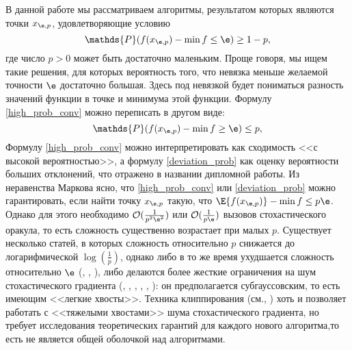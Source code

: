 В данной работе мы рассматриваем алгоритмы, результатом которых являются точки $x_{\e, p}$, удовлетворяющие условию
\begin{equation} \label{high_prob_conv}
   \mathds{P} (f(x_{\e, p})-\min f \le \e) \ge 1 - p,  
\end{equation}
где число $p > 0$ может быть достаточно маленьким. Проще говоря, мы ищем такие решения, для которых вероятность того, что невязка меньше желаемой точности $\e$ достаточно большая. Здесь под невязкой будет пониматься разность значений функции в точке и минимума этой функции. Формулу \eqref{high_prob_conv} можно переписать в другом виде:
\begin{equation} \label{deviation_prob}
   \mathds{P} (f(x_{\e, p})-\min f \ge \e) \le p,  
\end{equation}
Формулу \eqref{high_prob_conv} можно интерпретировать как сходимость <<с высокой вероятностью>>, а формулу \eqref{deviation_prob} как оценку вероятности больших отклонений, что отражено в названии дипломной работы.
Из неравенства Маркова ясно, что \eqref{high_prob_conv} или \eqref{deviation_prob} можно гарантировать, если найти точку $x_{\e, p}$ такую, что $\E{f(x_{\e, p})} - \min f \le p\e$. Однако для этого необходимо $\mathcal{O} (\frac{1}{p^2\e^2})$ или $\mathcal{O} (\frac{1}{p\e})$ вызовов стохастического оракула, то есть сложность существенно возрастает при малых $p$. Существует несколько статей, в которых сложность относительно $p$ снижается до логарифмической $\log(\frac{1}{p})$, однако либо в то же время ухудшается сложность относительно $\e$ (\cite{bousquet2002stability}, \cite{nesterov2008confidence}, \cite{shalev2009stochastic}), либо делаются более жесткие ограничения на шум стохастического градиента (\cite{nemirovski2009robust}, \cite{juditsky2014deterministic}, \cite{ghadimi2012optimal}, \cite{ghadimi2013optimal}, \cite{harvey2019simple}, \cite{harvey2019tight}): он предполагается субгауссовским, то есть имеющим <<легкие хвосты>>. Техника клиппирования (см.\cite{gorbunov2020stochastic}, \cite{gorbunov2024high}) хоть и позволяет работать с <<тяжелыми хвостами>> шума стохастического градиента, но требует исследования теоретических гарантий для каждого нового алгоритма,то есть не является общей оболочкой над алгоритмами.


